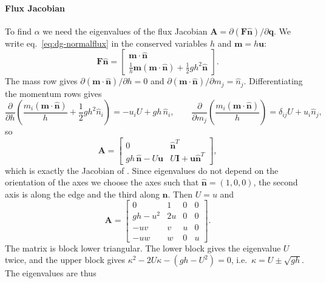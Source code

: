 \paragraph{Flux Jacobian}
To find $\alpha$ we need the eigenvalues of the flux Jacobian $\mathbf{A} = \partial(\mathbf{F}\hat{\mathbf{n}})/\partial\mathbf{q}$. We write eq.~\eqref{eq:dg-normalflux} in the conserved variables $h$ and $\mathbf{m} = h\mathbf{u}$:
\begin{equation*}
    \mathbf{F}\hat{\mathbf{n}} =
    \begin{bmatrix}
    \mathbf{m}\cdot\hat{\mathbf{n}}\\
    \frac1h\mathbf{m}(\mathbf{m}\cdot\hat{\mathbf{n}}) + \frac12gh^2\hat{\mathbf{n}}
    \end{bmatrix}.
\end{equation*}
The mass row gives $\partial(\mathbf{m}\cdot\hat{\mathbf{n}})/\partial h = 0$ and $\partial(\mathbf{m}\cdot\hat{\mathbf{n}})/\partial m_j = \hat{n}_j$. Differentiating the momentum rows gives
\begin{equation*}
    \frac{\partial}{\partial h}\left(\frac{m_i(\mathbf{m}\cdot\hat{\mathbf{n}})}{h} + \frac12gh^2\hat{n}_i\right) = -u_iU + gh\,\hat{n}_i, \qquad
    \frac{\partial}{\partial m_j}\left(\frac{m_i(\mathbf{m}\cdot\hat{\mathbf{n}})}{h}\right) = \delta_{ij}U + u_i\hat{n}_j,
\end{equation*}
so
\begin{equation}
    \mathbf{A} =
    \begin{bmatrix}
    0 & \hat{\mathbf{n}}^T\\
    gh\,\hat{\mathbf{n}} - U\mathbf{u} & U\mathbf{I} + \mathbf{u}\hat{\mathbf{n}}^T
    \end{bmatrix},
\end{equation}
which is exactly the Jacobian of \cite{GIRALDO2002499}. Since eigenvalues do not depend on the orientation of the axes we choose the axes such that $\hat{\mathbf{n}} = (1,0,0)$, the second axis is along the edge and the third along $\mathbf{n}$. Then $U = u$ and
\begin{equation*}
    \mathbf{A} =
    \begin{bmatrix}
    0 & 1 & 0 & 0\\
    gh - u^2 & 2u & 0 & 0\\
    -uv & v & u & 0\\
    -uw & w & 0 & u
    \end{bmatrix}.
\end{equation*}
The matrix is block lower triangular. The lower block gives the eigenvalue $U$ twice, and the upper block gives $\kappa^2 - 2U\kappa - (gh - U^2) = 0$, i.e.\ $\kappa = U\pm\sqrt{gh}$. The eigenvalues are thus
